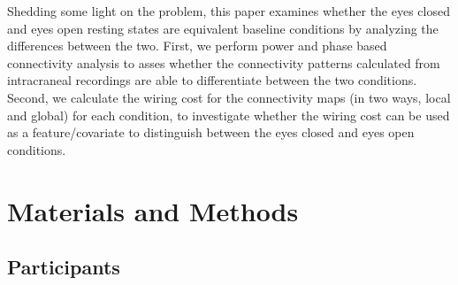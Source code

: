 \documentclass[11pt, onecolumn]{article}
\begin{document}
Shedding some light on the problem, this paper examines whether the eyes closed and eyes open resting states are equivalent baseline conditions by analyzing the differences between the two. 
First, we perform power and phase based connectivity analysis to asses whether the connectivity patterns calculated from intracraneal recordings  are able to differentiate between the two conditions. Second, we calculate the wiring cost for the connectivity maps (in two ways, local and global) for each condition, to investigate whether the wiring cost can be used as a feature/covariate to distinguish between the eyes closed and eyes open conditions. 
\section{Materials and Methods}
\label{se:maandme}
\subsection{Participants}
\end{document}
